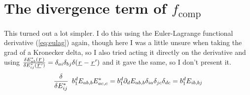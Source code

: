 \documentclass{article}
\newcommand\barbelow[1]{\stackunder[1.2pt]{$#1$}{\rule{1.5ex}{.1ex}}}
\newcommand{\su}[1]{\barbelow{#1}}
\newcommand{\pp}{\partial}
\begin{document}
\section{The divergence term of $f_\text{comp}$}
This turned out a lot simpler.
I do this using the Euler-Lagrange functional derivative (\cref{eq:eulag}) again, though here I was a little unsure when taking the grad of a Kronecker delta, so I also tried acting it directly on the derivative and using $\fdv{E_{ab}^*(\su{r})}{E_{ij}^*(\su{r}')} = \delta_{ai}\delta_{bj}\delta(\su{r}-\su{r}')$ and it gave the same, so I don't present it.
\begin{equation}
    \fdv{E_{ij}^*}\enspace b_1^d E_{ab,b}E_{ac,c}^* = b_1^d \pp_d E_{ab,b} \delta_{ia}\delta_{jc}\delta_{dc} = b_1^d E_{ib,bj}
\end{equation}
\end{document}
